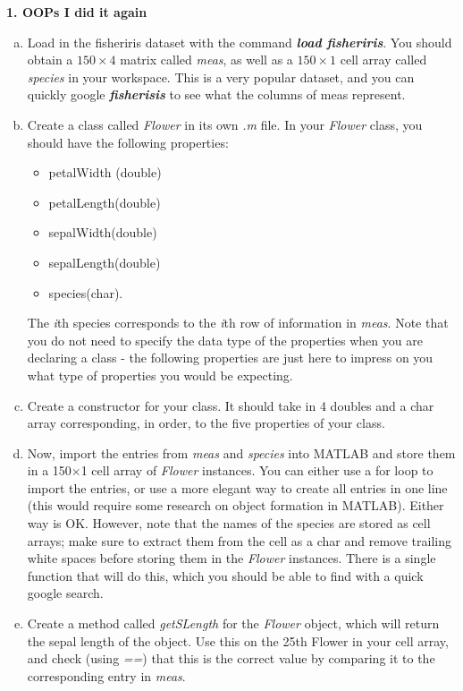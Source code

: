 \documentclass[11pt]{article}
\begin{document}
\noindent
\newline
\textbf{1. OOPs I did it again}
\begin{enumerate}[a.]
	\item  Load in the fisheriris dataset with the command \textbf{\textit{load fisheriris}}.
	You should obtain a $150 \times 4$ matrix called \textit{meas},
	as well as a $150 \times 1$ cell array called \textit{species} in your workspace.
	This is a very popular dataset, 
	and you can quickly google \textit{\textbf{fisherisis}} to see what the columns of meas represent. 

	\item Create a class called \textit{Flower} in its own \textit{.m} file.
	In your \textit{Flower} class, you should have the following properties:
	\begin{itemize} 
		\item petalWidth (double)
		\item petalLength(double)
		\item sepalWidth(double)
		\item sepalLength(double)
		\item species(char).
	\end{itemize}
	The \textit{i}th species corresponds to the \textit{i}th row of information in \textit{meas}.
	Note that you do not need to specify the data type of the properties when
	you are declaring a class - the following properties are just here to impress on you what
	type of properties you would be expecting. 
	
	\item Create a constructor for your class.
	It should take in 4 doubles and a char array corresponding, in order,
	to the five properties of your class.
	
	\item Now, import the entries from \textit{meas} and \textit{species} into MATLAB and
	store them in a 150$\times$1 cell array of \textit{Flower} instances.
	You can either use a for loop to import the entries,
	or use a more elegant way to create all entries in one line
	(this would require some research on object formation in MATLAB).
	Either way is OK.
	However, note that the names of the species are stored as cell arrays;
	make sure to extract them from the cell as a char and remove trailing white spaces
	before storing them in the \textit{Flower} instances.
	There is a single function that will do this,
	which you should be able to find with a quick google search.

	\item Create a method called \textit{getSLength} for the \textit{Flower} object,
	which will return the sepal length of the object.
	Use this on the 25th Flower in your cell array, and check (using \textit{==})
	that this is the correct value by comparing it to the corresponding entry in \textit{meas}.
	

\end{enumerate}
\end{document}
